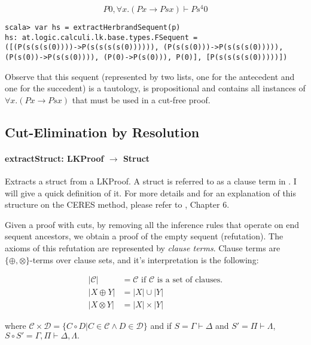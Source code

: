 \documentclass[a4paper, 11pt]{report}
\begin{document}
$$P0, \forall x. (Px \rightarrow Psx) \vdash Ps^4 0$$

\begin{lstlisting}
scala> var hs = extractHerbrandSequent(p)
hs: at.logic.calculi.lk.base.types.FSequent =
([(P(s(s(s(0))))->P(s(s(s(s(0)))))), (P(s(s(0)))->P(s(s(s(0))))),
(P(s(0))->P(s(s(0)))), (P(0)->P(s(0))), P(0)], [P(s(s(s(s(0)))))])
\end{lstlisting}

Observe that this sequent (represented by two lists, one for the antecedent and
one for the succedent) is a tautology, is propositional and contains all
instances of $\forall x. (Px \rightarrow Psx)$ that must be used in a cut-free
proof.

\subsection{Cut-Elimination by Resolution}


\paragraph{\textbf{extractStruct: LKProof $\rightarrow$ Struct}}
Extracts a struct from a LKProof. A struct is referred to as a clause term in
\cite{Baaz2011}. I will give a quick definition of it. For more details and
for an explanation of this structure on the CERES method, please refer to
\cite{Baaz2011}, Chapter 6.

Given a proof with cuts, by removing all the inference rules that operate on end
sequent ancestors, we obtain a proof of the empty sequent (refutation). The
axioms of this refutation are represented by \textit{clause terms}. Clause
terms are $\{\oplus, \otimes\}$-terms over clause sets, and it's interpretation
is the following:

\begin{align*}
  |\mathcal{C}| &= \mathcal{C} \text{ if $\mathcal{C}$ is a set of clauses.}\\
   |X \oplus Y| &= |X| \cup |Y|\\
  |X \otimes Y| &= |X| \times |Y|
\end{align*}

where $\mathcal{C} \times \mathcal{D} = \{ C \circ D | C \in \mathcal{C} \wedge
D \in \mathcal{D}\}$ and if $S = \Gamma \vdash \Delta$ and $S' = \Pi \vdash
\Lambda$, $S \circ S' = \Gamma, \Pi \vdash \Delta, \Lambda.$
\end{document}
